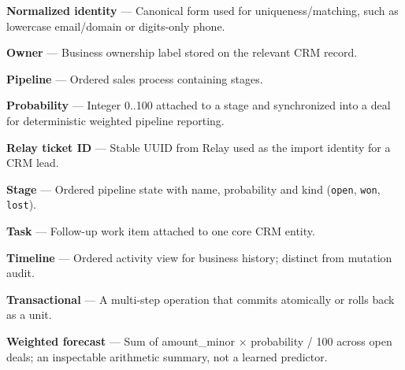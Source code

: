 \documentclass[
]{article}
\begin{document}
\textbf{Normalized identity} --- Canonical form used for
uniqueness/matching, such as lowercase email/domain or digits-only
phone.

\textbf{Owner} --- Business ownership label stored on the relevant CRM
record.

\textbf{Pipeline} --- Ordered sales process containing stages.

\textbf{Probability} --- Integer 0..100 attached to a stage and
synchronized into a deal for deterministic weighted pipeline reporting.

\textbf{Relay ticket ID} --- Stable UUID from Relay used as the import
identity for a CRM lead.

\textbf{Stage} --- Ordered pipeline state with name, probability and
kind (\texttt{open}, \texttt{won}, \texttt{lost}).

\textbf{Task} --- Follow-up work item attached to one core CRM entity.

\textbf{Timeline} --- Ordered activity view for business history;
distinct from mutation audit.

\textbf{Transactional} --- A multi-step operation that commits
atomically or rolls back as a unit.

\textbf{Weighted forecast} --- Sum of amount\_minor × probability / 100
across open deals; an inspectable arithmetic summary, not a learned
predictor.
\end{document}
